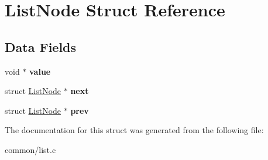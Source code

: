 \hypertarget{structListNode}{}\section{List\+Node Struct Reference}
\label{structListNode}
\subsection*{Data Fields}
\begin{DoxyCompactItemize}
\item 
void $\ast$ {\bfseries value}\hypertarget{structListNode_a37d57c0848e6d3a67644fd7575d939f9}{}\label{structListNode_a37d57c0848e6d3a67644fd7575d939f9}

\item 
struct \hyperlink{structListNode}{List\+Node} $\ast$ {\bfseries next}\hypertarget{structListNode_a232112b6981e0fa380e985d199d1f7b3}{}\label{structListNode_a232112b6981e0fa380e985d199d1f7b3}

\item 
struct \hyperlink{structListNode}{List\+Node} $\ast$ {\bfseries prev}\hypertarget{structListNode_a29fdf2fe3118d1b3da8891b28c943f79}{}\label{structListNode_a29fdf2fe3118d1b3da8891b28c943f79}

\end{DoxyCompactItemize}


The documentation for this struct was generated from the following file\+:\begin{DoxyCompactItemize}
\item 
common/list.\+c\end{DoxyCompactItemize}

